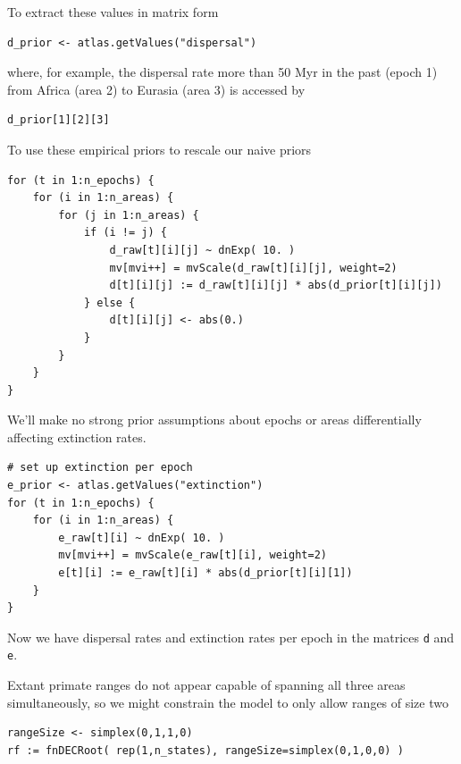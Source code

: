 To extract these values in matrix form

\begin{snugshade}
\begin{lstlisting}
d_prior <- atlas.getValues("dispersal")
\end{lstlisting}
\end{snugshade}

where, for example, the dispersal rate more than 50 Myr in the past (epoch 1) from Africa (area 2) to Eurasia (area 3) is accessed by

\begin{snugshade}
\begin{lstlisting}
d_prior[1][2][3]
\end{lstlisting}
\end{snugshade}

To use these empirical priors to rescale our naive priors

\begin{snugshade}
\begin{lstlisting}
for (t in 1:n_epochs) {
	for (i in 1:n_areas) {
		for (j in 1:n_areas) {
			if (i != j) {
				d_raw[t][i][j] ~ dnExp( 10. )
				mv[mvi++] = mvScale(d_raw[t][i][j], weight=2)
				d[t][i][j] := d_raw[t][i][j] * abs(d_prior[t][i][j])
			} else {
				d[t][i][j] <- abs(0.)
			}
		}
	}
}
\end{lstlisting}
\end{snugshade}

We'll make no strong prior assumptions about epochs or areas differentially affecting extinction rates.

\begin{snugshade}
\begin{lstlisting}
# set up extinction per epoch
e_prior <- atlas.getValues("extinction")
for (t in 1:n_epochs) {
	for (i in 1:n_areas) {
		e_raw[t][i] ~ dnExp( 10. )
		mv[mvi++] = mvScale(e_raw[t][i], weight=2)
		e[t][i] := e_raw[t][i] * abs(d_prior[t][i][1])
	}
}
\end{lstlisting}
\end{snugshade}

Now we have dispersal rates and extinction rates per epoch in the matrices {\tt d} and {\tt e}.

Extant primate ranges do not appear capable of spanning all three areas simultaneously, so we might constrain the model to only allow ranges of size two

\begin{snugshade}
\begin{lstlisting}
rangeSize <- simplex(0,1,1,0)
rf := fnDECRoot( rep(1,n_states), rangeSize=simplex(0,1,0,0) )
\end{lstlisting}
\end{snugshade}

